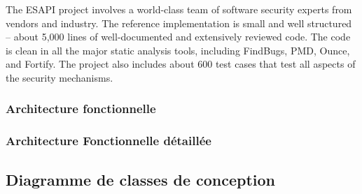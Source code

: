 The ESAPI project involves a world-class team of software security experts from vendors and industry.
The reference implementation is small and well structured – about 5,000 lines of well-documented and
extensively reviewed code. The code is clean in all the major static analysis tools, including FindBugs,
PMD, Ounce, and Fortify. The project also includes about 600 test cases that test all aspects of the
security mechanisms. 

\subsubsection{Architecture fonctionnelle}
\subsubsection{Architecture Fonctionnelle détaillée}

\subsection{Diagramme de classes de conception}
